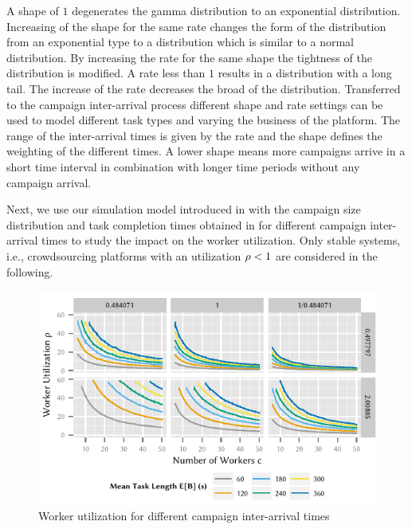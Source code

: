A shape of \(1\) degenerates the gamma distribution to an exponential distribution.
Increasing of the shape for the same rate changes the form of the distribution from an exponential type to a distribution which is similar to a normal distribution.
By increasing the rate for the same shape the tightness of the distribution is modified.
A rate less than \(1\) results in a distribution with a long tail.
The increase of the rate decreases the broad of the distribution.
Transferred to the campaign inter-arrival process different shape and rate settings can be used to model different task types and varying the business of the platform.
The range of the inter-arrival times is given by the rate and the shape defines the weighting of the different times.
A lower shape means more campaigns arrive in a short time interval in combination with longer time periods without any campaign arrival.

Next, we use our simulation model introduced in  with the campaign size distribution and task completion times obtained in  for different campaign inter-arrival times to study the impact on the worker utilization. 
Only stable systems, i.e., crowdsourcing platforms with an utilization \(\rho < 1\) are considered in the following.

\begin{figure}
	\centering
	\includegraphics{cloud/crowdsourcing/numerical_evaluation/figures/parameter_utilization}
	\caption{Worker utilization for different campaign inter-arrival times}
	\label{fig:cloud:crowdsourcing:performance_evaluation:distributions:parameter_utilization}
\end{figure}

